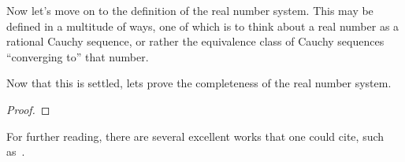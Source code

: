 Now let's move on to the definition of the real number system. This
may be defined in a multitude of ways, one of which is to think about
a real number as a rational Cauchy sequence, or rather the equivalence
class of Cauchy sequences ``converging to'' that number.

\begin{definition}
    \lipsum[1]
\end{definition}

Now that this is settled, lets prove the completeness of the real
number system.

\begin{theorem}
    \label{th:realnumberscomplete}
    \lipsum[1]
\end{theorem}
\begin{proof}
    \lipsum[1]
\end{proof}

For further reading, there are several excellent works that one could
cite, such as~\cite{book:2946356}.

\begin{example}
    \lipsum[1]
\end{example}
\begin{solution}
    \lipsum[1]
\end{solution}

\begin{example}
    \lipsum[1]
\end{example}
\begin{solution}
    \lipsum[1]
\end{solution}

\begin{example}
    \lipsum[1]
\end{example}
\begin{solution}
    \lipsum[1]
\end{solution}

\begin{problem}
    \lipsum[1]
\end{problem}
\begin{solution}
    \lipsum[1]
\end{solution}